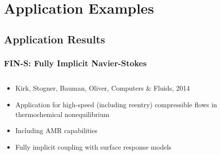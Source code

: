 \section{Application Examples}
\subsection{Application Results}



\frame
{
  \Large
  \begin{block}{}
  \end{block}
}



\frame
{
  \frametitle{FIN-S: Fully Implicit Navier-Stokes}

  \begin{columns}
    \begin{column}{0.45\textwidth}
      \begin{itemize}
      \item Kirk, Stogner, Bauman, Oliver, Computers \& Fluids, 2014
      \item Application for high-speed (including reentry)
        compressible flows in thermochemical nonequilibrium
      \item Including AMR capabilities
      \item Fully implicit coupling with surface response models
      \end{itemize}
    \end{column}
    \begin{column}{0.45\textwidth}
      \begin{center}
      \end{center}
    \end{column}
  \end{columns}
}


